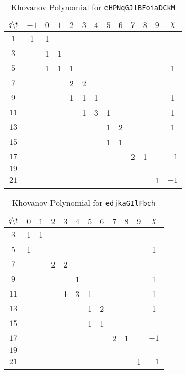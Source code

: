 \begin{table}
    \centering
    \begin{tabular}{| c | c | c | c | c | c | c | c | c | c | c | c | c |}
        \hline
        $q\symbol{92}t$&$-1$&$0$&$1$&$2$&$3$&$4$&$5$&$6$&$7$&$8$&$9$&$\chi$\\
        \hline
        $1$&1&1&&&&&&&&&&\\
        \hline
        $3$&&1&1&&&&&&&&&\\
        \hline
        $5$&&1&1&1&&&&&&&&1\\
        \hline
        $7$&&&&2&2&&&&&&&\\
        \hline
        $9$&&&&1&1&1&&&&&&1\\
        \hline
        $11$&&&&&1&3&1&&&&&1\\
        \hline
        $13$&&&&&&&1&2&&&&1\\
        \hline
        $15$&&&&&&&1&1&&&&\\
        \hline
        $17$&&&&&&&&&2&1&&$-1$\\
        \hline
        $19$&&&&&&&&&&&&\\
        \hline
        $21$&&&&&&&&&&&1&$-1$\\
        \hline
    \end{tabular}
    \caption{Khovanov Polynomial for \texttt{eHPNqGJlBFoiaDCkM}}
\end{table}
\begin{table}
    \centering
    \begin{tabular}{| c | c | c | c | c | c | c | c | c | c | c | c |}
        \hline
        $q\symbol{92}t$&$0$&$1$&$2$&$3$&$4$&$5$&$6$&$7$&$8$&$9$&$\chi$\\
        \hline
        $3$&1&1&&&&&&&&&\\
        \hline
        $5$&1&&&&&&&&&&1\\
        \hline
        $7$&&&2&2&&&&&&&\\
        \hline
        $9$&&&&&1&&&&&&1\\
        \hline
        $11$&&&&1&3&1&&&&&1\\
        \hline
        $13$&&&&&&1&2&&&&1\\
        \hline
        $15$&&&&&&1&1&&&&\\
        \hline
        $17$&&&&&&&&2&1&&$-1$\\
        \hline
        $19$&&&&&&&&&&&\\
        \hline
        $21$&&&&&&&&&&1&$-1$\\
        \hline
    \end{tabular}
    \caption{Khovanov Polynomial for \texttt{edjkaGIlFbch}}
\end{table}
